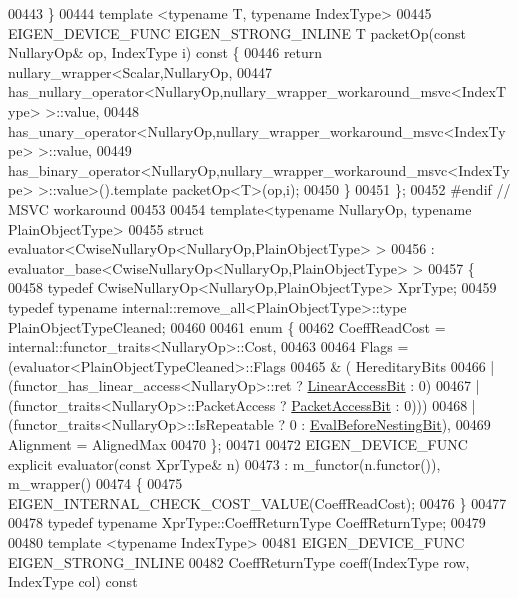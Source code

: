 \begin{DoxyCode}
00443   \}
00444   \textcolor{keyword}{template} <\textcolor{keyword}{typename} T, \textcolor{keyword}{typename} IndexType>
00445   EIGEN\_DEVICE\_FUNC EIGEN\_STRONG\_INLINE T packetOp(\textcolor{keyword}{const} NullaryOp& op, IndexType i)\textcolor{keyword}{ const }\{
00446     \textcolor{keywordflow}{return} nullary\_wrapper<Scalar,NullaryOp,
00447     has\_nullary\_operator<NullaryOp,nullary\_wrapper\_workaround\_msvc<IndexType> >::value,
00448     has\_unary\_operator<NullaryOp,nullary\_wrapper\_workaround\_msvc<IndexType> >::value,
00449     has\_binary\_operator<NullaryOp,nullary\_wrapper\_workaround\_msvc<IndexType> >::value>().\textcolor{keyword}{template} 
      packetOp<T>(op,i);
00450   \}
00451 \};
00452 \textcolor{preprocessor}{#endif // MSVC workaround}
00453 
00454 \textcolor{keyword}{template}<\textcolor{keyword}{typename} NullaryOp, \textcolor{keyword}{typename} PlainObjectType>
00455 \textcolor{keyword}{struct }evaluator<CwiseNullaryOp<NullaryOp,PlainObjectType> >
00456   : evaluator\_base<CwiseNullaryOp<NullaryOp,PlainObjectType> >
00457 \{
00458   \textcolor{keyword}{typedef} CwiseNullaryOp<NullaryOp,PlainObjectType> XprType;
00459   \textcolor{keyword}{typedef} \textcolor{keyword}{typename} internal::remove\_all<PlainObjectType>::type PlainObjectTypeCleaned;
00460   
00461   \textcolor{keyword}{enum} \{
00462     CoeffReadCost = internal::functor\_traits<NullaryOp>::Cost,
00463     
00464     Flags = (evaluator<PlainObjectTypeCleaned>::Flags
00465           &  (  HereditaryBits
00466               | (functor\_has\_linear\_access<NullaryOp>::ret  ? \hyperlink{group__flags_ga4b983a15d57cd55806df618ac544d09e}{LinearAccessBit} : 0)
00467               | (functor\_traits<NullaryOp>::PacketAccess    ? \hyperlink{group__flags_ga1a306a438e1ab074e8be59512e887b9f}{PacketAccessBit} : 0)))
00468           | (functor\_traits<NullaryOp>::IsRepeatable ? 0 : \hyperlink{group__flags_gaa34e83bae46a8eeae4e69ebe3aaecbed}{EvalBeforeNestingBit}),
00469     Alignment = AlignedMax
00470   \};
00471 
00472   EIGEN\_DEVICE\_FUNC \textcolor{keyword}{explicit} evaluator(\textcolor{keyword}{const} XprType& n)
00473     : m\_functor(n.functor()), m\_wrapper()
00474   \{
00475     EIGEN\_INTERNAL\_CHECK\_COST\_VALUE(CoeffReadCost);
00476   \}
00477 
00478   \textcolor{keyword}{typedef} \textcolor{keyword}{typename} XprType::CoeffReturnType CoeffReturnType;
00479 
00480   \textcolor{keyword}{template} <\textcolor{keyword}{typename} IndexType>
00481   EIGEN\_DEVICE\_FUNC EIGEN\_STRONG\_INLINE
00482   CoeffReturnType coeff(IndexType row, IndexType col)\textcolor{keyword}{ const}

\end{DoxyCode}
